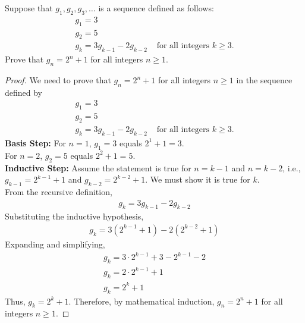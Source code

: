 \documentclass[name=Ojas\ Chaturvedi, emailid=oj.chaturvedi.2024, course=Capstone:\ Discrete\ Math, num=9, deadline={November\ 17,\ 2023}]{homework}
\begin{document}
    Suppose that $g_1, g_2, g_3, \ldots$ is a sequence defined as follows:
    \begin{align*}
        g_1 = 3 \\
        g_2 = 5 \\
        g_k = 3g_{k-1} - 2g_{k-2} & \text{ for all integers } k \geq 3.
    \end{align*}
    Prove that $g_n = 2^n + 1$ for all integers $n \geq 1$.
\begin{proof}
    We need to prove that $g_n = 2^n + 1$ for all integers $n \geq 1$ in the sequence defined by
    \begin{align*}
        g_1 = 3 \\
        g_2 = 5 \\
        g_k = 3g_{k-1} - 2g_{k-2} & \text{ for all integers } k \geq 3.
    \end{align*}
    \textbf{Basis Step:}
    For $n = 1$, $g_1 = 3$ equals $2^1 + 1 = 3$. \\
    For $n = 2$, $g_2 = 5$ equals $2^2 + 1 = 5$. \\
    \textbf{Inductive Step:}
    Assume the statement is true for $n = k-1$ and $n = k-2$, i.e., $g_{k-1} = 2^{k-1} + 1$ and $g_{k-2} = 2^{k-2} + 1$. We must show it is true for $k$. \\
    From the recursive definition,
    \begin{align*}
        g_k = 3g_{k-1} - 2g_{k-2}
    \end{align*}
    Substituting the inductive hypothesis,
    \begin{align*}
        g_k = 3(2^{k-1} + 1) - 2(2^{k-2} + 1)
    \end{align*}
    Expanding and simplifying,
    \begin{align*}
        g_k = 3 \cdot 2^{k-1} + 3 - 2^{k-1} - 2 \\
        g_k = 2 \cdot 2^{k-1} + 1 \\
        g_k = 2^k + 1
    \end{align*}
    Thus, $g_k = 2^k + 1$.
    Therefore, by mathematical induction, $g_n = 2^n + 1$ for all integers $n \geq 1$.
\end{proof}
\end{document}
